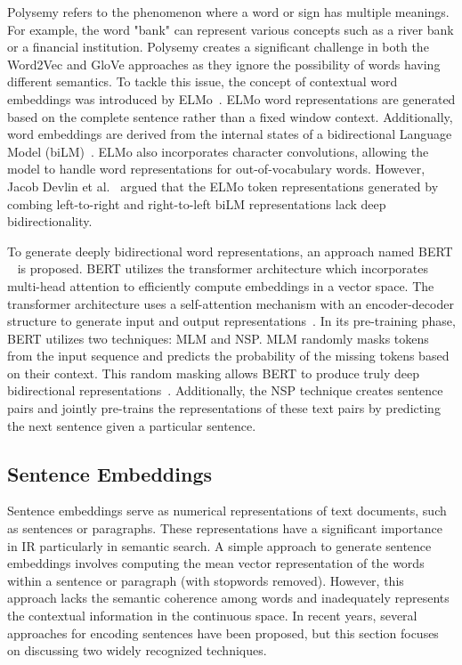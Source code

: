 Polysemy refers to the phenomenon where a word or sign has multiple meanings. For example, the word "bank" can represent various concepts such as a river bank or a financial institution. Polysemy creates a significant challenge in both the Word2Vec and \ac{GloVe} approaches as they ignore the possibility of words having different semantics. To tackle this issue, the concept of contextual word embeddings was introduced by \ac{ELMo}~\cite{peters2018deep}. \ac{ELMo} word representations are generated based on the complete sentence rather than a fixed window context. Additionally, word embeddings are derived from the internal states of a bidirectional Language Model (biLM)~\cite{peters2018deep}. \ac{ELMo} also incorporates character convolutions, allowing the model to handle word representations for out-of-vocabulary words. However, Jacob Devlin et al.~\cite{devlin2018bert} argued that the \ac{ELMo} token representations generated by combing left-to-right and right-to-left biLM representations lack deep bidirectionality.


To generate deeply bidirectional word representations, an approach named \ac{BERT} ~\cite{devlin2018bert} is proposed. \ac{BERT} utilizes the transformer architecture which incorporates multi-head attention to efficiently compute embeddings in a vector space. The transformer architecture uses a self-attention mechanism with an encoder-decoder structure to generate input and output representations~\cite{vaswani2017attention}. In its pre-training phase, \ac{BERT} utilizes two techniques: \ac{MLM} and \ac{NSP}. \ac{MLM} randomly masks tokens from the input sequence and predicts the probability of the missing tokens based on their context. This random masking allows \ac{BERT} to produce truly deep bidirectional representations~\cite{devlin2018bert}. Additionally, the \ac{NSP} technique creates sentence pairs and jointly pre-trains the representations of these text pairs by predicting the next sentence given a particular sentence.


\subsection{Sentence Embeddings}

Sentence embeddings serve as numerical representations of text documents, such as sentences or paragraphs. These representations have a significant importance in \ac{IR} particularly in semantic search. A simple approach to generate sentence embeddings involves computing the mean vector representation of the words within a sentence or paragraph (with stopwords removed). However, this approach lacks the semantic coherence among words and inadequately represents the contextual information in the continuous space. In recent years, several approaches for encoding sentences have been proposed, but this section focuses on discussing two widely recognized techniques.

